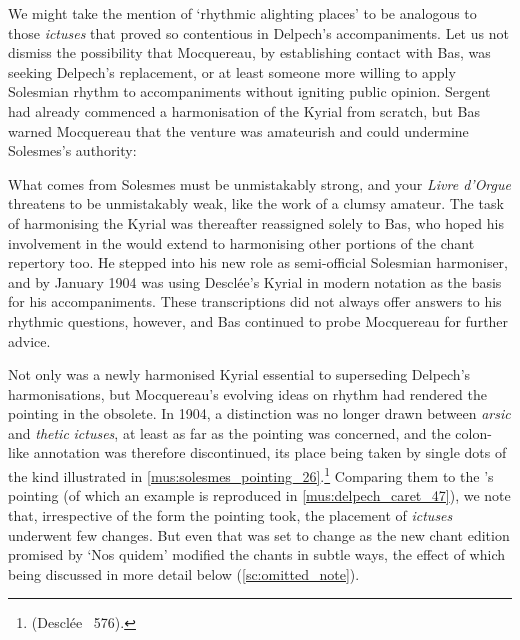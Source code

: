 We might take the mention of `rhythmic alighting places' to be analogous to those \mbox{\emph{ictuses}} that proved so contentious in Delpech's accompaniments.
Let us not dismiss the possibility that Mocquereau, by establishing contact with Bas, was seeking Delpech's replacement, or at least someone more willing to apply Solesmian rhythm to accompaniments without igniting public opinion.
Sergent had already commenced a harmonisation of the Kyrial from scratch, but Bas warned Mocquereau that the venture was amateurish and could undermine Solesmes's authority:
\pagebreak{}

  {}
{What comes from Solesmes must be unmistakably strong, and your \emph{Livre d'Orgue} threatens to be unmistakably weak, like the work of a clumsy amateur.}
\noindent
The task of harmonising the Kyrial was thereafter reassigned solely to Bas, who hoped his involvement in the \ldo{} would extend to harmonising other portions of the chant repertory too.
He stepped into his new role as semi-official Solesmian harmoniser, and by January 1904 was using Desclée's Kyrial in modern notation as the basis for his accompaniments.
These transcriptions did not always offer answers to his rhythmic questions, however, and Bas continued to probe Mocquereau for further advice.

Not only was a newly harmonised Kyrial essential to superseding Delpech's harmonisations, but Mocquereau's evolving ideas on rhythm had rendered the pointing in the \ldo{} obsolete.
In 1904, a distinction was no longer drawn between \emph{arsic} and \emph{thetic} \emph{ictuses}, at least as far as the pointing was concerned, and the colon-like annotation was therefore discontinued, its place being taken by single dots of the kind illustrated in \cref{mus:solesmes_pointing_26}.\footnote{\cite[26]{KyrialeseuOrdinarium1904} (Desclée \textnumero{}~576).}
Comparing them to the \ldo{}'s pointing (of which an example is reproduced in \cref{mus:delpech_caret_47}), we note that, irrespective of the form the pointing took, the placement of \emph{ictuses} underwent few changes.
But even that was set to change as the new chant edition promised by `Nos quidem' modified the chants in subtle ways, the effect of which being discussed in more detail below (\cref{sc:omitted_note}).

